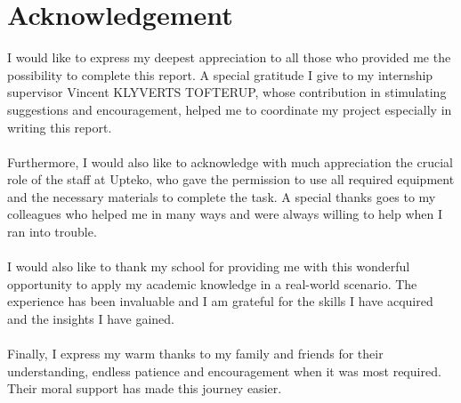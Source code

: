 \chapter*{Acknowledgement}

I would like to express my deepest appreciation to all those who provided me the possibility to complete this report. A special gratitude I give to my internship supervisor Vincent KLYVERTS TOFTERUP, whose contribution in stimulating suggestions and encouragement, helped me to coordinate my project especially in writing this report.
\\ \\
Furthermore, I would also like to acknowledge with much appreciation the crucial role of the staff at Upteko, who gave the permission to use all required equipment and the necessary materials to complete the task. A special thanks goes to my colleagues who helped me in many ways and were always willing to help when I ran into trouble.
\\ \\
I would also like to thank my school for providing me with this wonderful opportunity to apply my academic knowledge in a real-world scenario. The experience has been invaluable and I am grateful for the skills I have acquired and the insights I have gained.
\\ \\
Finally, I express my warm thanks to my family and friends for their understanding, endless patience and encouragement when it was most required. Their moral support has made this journey easier.
